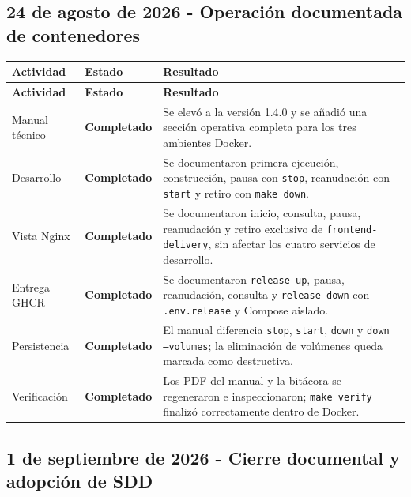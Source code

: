 \documentclass[11pt,letterpaper]{article}
\newcommand{\statusok}{\textcolor{deepgreen}{\textbf{Completado}}}
\newcommand{\file}[1]{\texttt{#1}}
\begin{document}
\subsection{24 de agosto de 2026 - Operación documentada de contenedores}

\begin{longtable}{@{}p{}p{}p{}@{}}
  \toprule
  \textbf{Actividad} & \textbf{Estado} & \textbf{Resultado} \\
  \midrule
  \endfirsthead
  \toprule
  \textbf{Actividad} & \textbf{Estado} & \textbf{Resultado} \\
  \midrule
  \endhead
  Manual técnico & \statusok & Se elevó a la versión 1.4.0 y se añadió una sección operativa completa para los tres ambientes Docker. \\
  Desarrollo & \statusok & Se documentaron primera ejecución, construcción, pausa con \file{stop}, reanudación con \file{start} y retiro con \file{make down}. \\
  Vista Nginx & \statusok & Se documentaron inicio, consulta, pausa, reanudación y retiro exclusivo de \file{frontend-delivery}, sin afectar los cuatro servicios de desarrollo. \\
  Entrega GHCR & \statusok & Se documentaron \file{release-up}, pausa, reanudación, consulta y \file{release-down} con \file{.env.release} y Compose aislado. \\
  Persistencia & \statusok & El manual diferencia \file{stop}, \file{start}, \file{down} y \file{down --volumes}; la eliminación de volúmenes queda marcada como destructiva. \\
  Verificación & \statusok & Los PDF del manual y la bitácora se regeneraron e inspeccionaron; \file{make verify} finalizó correctamente dentro de Docker. \\
  \bottomrule
\end{longtable}

\clearpage
\subsection{1 de septiembre de 2026 - Cierre documental y adopción de SDD}
\end{document}
